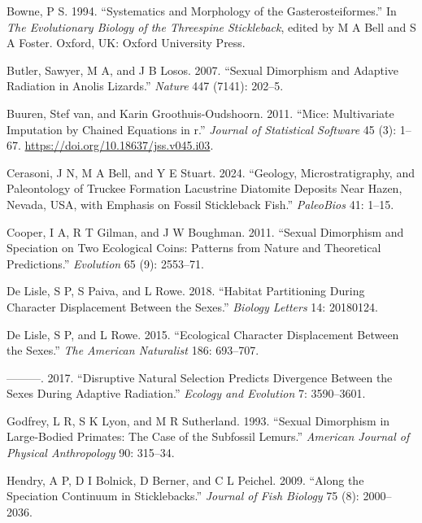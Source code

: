 \documentclass[
  12pt,
]{article}
\newlength{\cslhangindent}
\newlength{\cslentryspacingunit} %
\newenvironment{CSLReferences}[2] %
 {%
  \setlength{\parindent}{0pt}
  \ifodd #1
  \let\oldpar\par
  \def\par{\hangindent=\cslhangindent\oldpar}
  \fi
  \setlength{\parskip}{#2\cslentryspacingunit}
 }%
 {}
\begin{document}
\begin{CSLReferences}{1}{0}
\leavevmode{}%
Bowne, P S. 1994. {``Systematics and Morphology of the
Gasterosteiformes.''} In \emph{The Evolutionary Biology of the
Threespine Stickleback}, edited by M A Bell and S A Foster. Oxford, UK:
Oxford University Press.

\leavevmode{}%
Butler, Sawyer, M A, and J B Losos. 2007. {``Sexual Dimorphism and
Adaptive Radiation in Anolis Lizards.''} \emph{Nature} 447 (7141):
202--5.

\leavevmode{}%
Buuren, Stef van, and Karin Groothuis-Oudshoorn. 2011. {``Mice:
Multivariate Imputation by Chained Equations in r.''} \emph{Journal of
Statistical Software} 45 (3): 1--67.
\url{https://doi.org/10.18637/jss.v045.i03}.

\leavevmode{}%
Cerasoni, J N, M A Bell, and Y E Stuart. 2024. {``Geology,
Microstratigraphy, and Paleontology of Truckee Formation Lacustrine
Diatomite Deposits Near Hazen, Nevada, USA, with Emphasis on Fossil
Stickleback Fish.''} \emph{PaleoBios} 41: 1--15.

\leavevmode{}%
Cooper, I A, R T Gilman, and J W Boughman. 2011. {``Sexual Dimorphism
and Speciation on Two Ecological Coins: Patterns from Nature and
Theoretical Predictions.''} \emph{Evolution} 65 (9): 2553--71.

\leavevmode{}%
De Lisle, S P, S Paiva, and L Rowe. 2018. {``Habitat Partitioning During
Character Displacement Between the Sexes.''} \emph{Biology Letters} 14:
20180124.

\leavevmode{}%
De Lisle, S P, and L Rowe. 2015. {``Ecological Character Displacement
Between the Sexes.''} \emph{The American Naturalist} 186: 693--707.

\leavevmode{}%
---------. 2017. {``Disruptive Natural Selection Predicts Divergence
Between the Sexes During Adaptive Radiation.''} \emph{Ecology and
Evolution} 7: 3590--3601.

\leavevmode{}%
Godfrey, L R, S K Lyon, and M R Sutherland. 1993. {``Sexual Dimorphism
in Large-Bodied Primates: The Case of the Subfossil Lemurs.''}
\emph{American Journal of Physical Anthropology} 90: 315--34.

\leavevmode{}%
Hendry, A P, D I Bolnick, D Berner, and C L Peichel. 2009. {``Along the
Speciation Continuum in Sticklebacks.''} \emph{Journal of Fish Biology}
75 (8): 2000--2036.


\end{CSLReferences}
\end{document}

